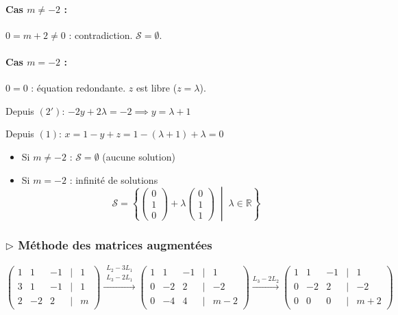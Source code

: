 \documentclass[12pt,a4paper]{article}
\begin{document}
\paragraph{Cas $m \neq -2$ :} $0 = m+2 \neq 0$ : contradiction. $\mathcal{S} = \emptyset$.

\paragraph{Cas $m = -2$ :} $0 = 0$ : équation redondante. $z$ est libre ($z = \lambda$).

Depuis $(2')$: $-2y + 2\lambda = -2 \implies y = \lambda + 1$

Depuis $(1)$: $x = 1 - y + z = 1 - (\lambda+1) + \lambda = 0$

\begin{solbox}
\begin{itemize}[noitemsep]
  \item Si $m \neq -2$ : $\mathcal{S} = \emptyset$ (aucune solution)
  \item Si $m = -2$ : infinité de solutions
  \[
    \mathcal{S} = \left\{\begin{pmatrix} 0 \\ 1 \\ 0 \end{pmatrix}
    + \lambda \begin{pmatrix} 0 \\ 1 \\ 1 \end{pmatrix}
    \;\middle|\; \lambda \in \mathbb{R}\right\}
  \]
\end{itemize}
\end{solbox}

\subsubsection*{$\triangleright$ Méthode des matrices augmentées}

\[
\begin{pmatrix}
1 & 1 & -1 & \mid & 1 \\
3 & 1 & -1 & \mid & 1 \\
2 & -2 & 2 & \mid & m
\end{pmatrix}
\xrightarrow{\substack{L_2-3L_1 \\ L_3-2L_1}}
\begin{pmatrix}
1 & 1 & -1 & \mid & 1 \\
0 & -2 & 2 & \mid & -2 \\
0 & -4 & 4 & \mid & m-2
\end{pmatrix}
\xrightarrow{L_3-2L_2}
\begin{pmatrix}
1 & 1 & -1 & \mid & 1 \\
0 & -2 & 2 & \mid & -2 \\
0 & 0 & 0 & \mid & m+2
\end{pmatrix}
\]
\end{document}
